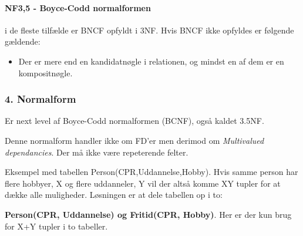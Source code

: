 \paragraph{NF3,5 - Boyce-Codd normalformen} i de fleste tilfælde er BNCF opfyldt i 3NF. Hvis BNCF ikke opfyldes er følgende gældende:
	
\begin{itemize}
	\item Der er mere end en kandidatnøgle i relationen, og mindst en af dem er en kompositnøgle.
\end{itemize}
	
\subsubsection{4. Normalform}
Er next level af Boyce-Codd normalformen (BCNF), også kaldet 3.5NF.

Denne normalform handler ikke om FD'er men derimod om \textit{Multivalued dependancies}.
Der må ikke være repeterende felter.

Eksempel med tabellen Person(CPR,Uddannelse,Hobby). Hvis samme person har flere hobbyer, X og flere uddanneler, Y vil der altså komme XY tupler for at dække alle muligheder. Løsningen er at dele tabellen op i to: 

\textbf{Person(CPR, Uddannelse) og Fritid(CPR, Hobby)}. Her er der kun brug for X+Y tupler i to tabeller.

